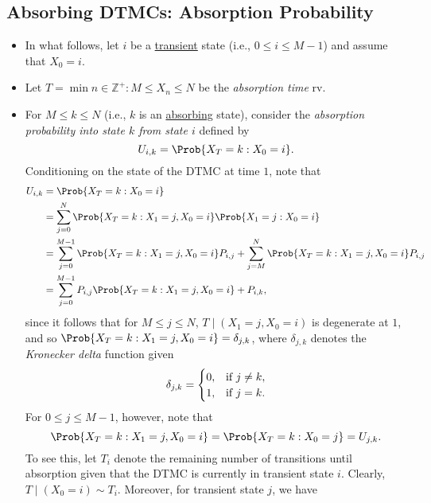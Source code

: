 \subsection*{Absorbing DTMCs: Absorption Probability}
\begin{itemize}
    \item In what follows, let $ i $ be a \underline{transient} state (i.e., $ 0\le i\le M-1 $) and assume that $ X_0=i $.
    \item Let $ T=\min{n\in\mathbb{Z}^+:M\le X_n\le N} $ be the \emph{absorption time} rv.
    \item For $ M\le k\le N $ (i.e., $k$ is an \underline{absorbing} state), consider the \emph{absorption probability into state $k$
              from state $i$} defined by
          \[ U_{i,k}=\Prob{X_T=k\given X_0=i}. \]
          Conditioning on the state of the DTMC at time $1$, note that
          \begin{align*}
              U_{i, k}
               & =\Prob{X_{T}=k \given X_{0}=i}                                                                                                   \\
               & =\sum_{j=0}^{N} \Prob{X_{T}=k \given X_{1}=j, X_{0}=i} \Prob{X_{1}=j \given X_{0}=i}                                             \\
               & =\sum_{j=0}^{M-1} \Prob{X_{T}=k \given X_{1}=j, X_{0}=i} P_{i, j}+\sum_{j=M}^{N} \Prob{X_{T}=k \given X_{1}=j, X_{0}=i} P_{i, j} \\
               & =\sum_{j=0}^{M-1} P_{i, j} \Prob{X_{T}=k \given X_{1}=j, X_{0}=i}+P_{i, k},
          \end{align*}
          since it follows that for $ M\le j\le N $, $ T\mid(X_1=j,X_0=i) $ is degenerate at $1$, and so
          $ \Prob{X_T=k\given X_1=j,X_0=i}=\delta_{j,k} $, where $ \delta_{j,k} $ denotes the \emph{Kronecker delta} function given
          \[ \delta_{j,k}=\begin{cases}
                  0, & \text{if $ j\ne k $}, \\
                  1, & \text{if $ j=k $}.
              \end{cases} \]
          For $ 0\le j\le M-1 $, however, note that
          \[ \Prob{X_T=k\given X_1=j,X_0=i}=\Prob{X_T=k\given X_0=j}=U_{j,k}. \]
          To see this, let $T_i$ denote the remaining number of transitions until absorption given that the
          DTMC is currently in transient state $i$. Clearly, $ T\mid(X_0=i)\sim T_i $. Moreover, for transient state $ j $, we have

\end{itemize}
